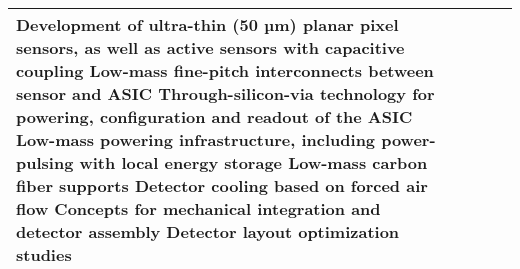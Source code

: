 \begin{sidewaystable}[h]
\begin{adjustbox}{max width=1\textwidth}
\begin{tabularx}{2\textwidth}{lXXXX}
        Development of ultra-thin (50 µm) planar pixel sensors, as well as active sensors with capacitive coupling\newline
        Low-mass fine-pitch interconnects between sensor and ASIC \newline
        Through-silicon-via technology for powering, configuration and readout of the ASIC\newline
        Low-mass powering infrastructure, including power-pulsing with local energy storage\newline
        Low-mass carbon fiber supports \newline
        Detector cooling based on forced air flow \newline
        Concepts for mechanical integration and detector assembly \newline
        Detector layout optimization studies \\
    \bottomrule
\end{tabularx}
\end{adjustbox}

\end{sidewaystable}
